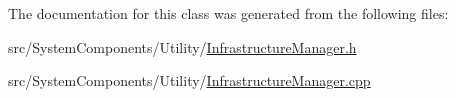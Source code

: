 The documentation for this class was generated from the following files\+:\begin{DoxyCompactItemize}
\item 
src/\+System\+Components/\+Utility/\mbox{\hyperlink{InfrastructureManager_8h}{Infrastructure\+Manager.\+h}}\item 
src/\+System\+Components/\+Utility/\mbox{\hyperlink{InfrastructureManager_8cpp}{Infrastructure\+Manager.\+cpp}}\end{DoxyCompactItemize}
